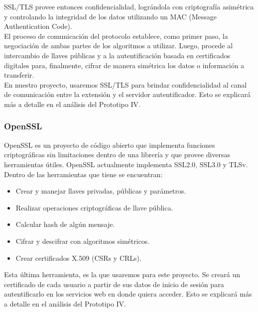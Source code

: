 \documentclass[12pt, a4paper, titlepage]{report}
\begin{document}
                SSL/TLS provee entonces confidencialidad, lográndola con criptografía asimétrica y controlando la integridad de los datos utilizando un MAC (Message Authentication Code).\\
                
                El proceso de comunicación del protocolo establece, como primer paso, la negociación de ambas partes de los algoritmos a utilizar. Luego, procede al intercambio de llaves públicas y a la autentificación basada en certificados digitales para, finalmente, cifrar de manera simétrica los datos o información a transferir.\cite{refCriptografia}\\
                
                En nuestro proyecto, usaremos SSL/TLS para brindar confidencialidad al canal de comunicación entre la extensión y el servidor autentificador. Esto se explicará más a detalle en el análisis del Prototipo IV.
                
                \subsubsection{OpenSSL}
	            OpenSSL es un proyecto de código abierto que implementa funciones criptográficas sin limitaciones dentro de una librería y que provee diversas herramientas útiles. OpenSSL actualmente implementa SSL2.0, SSL3.0 y TLSv.\cite{refCriptografia}\\
	            
	            Dentro de las herramientas que tiene se encuentran: 
	            \begin{itemize}
	                \item Crear y manejar llaves privadas, públicas y parámetros.
	                \item Realizar operaciones criptográficas de llave pública.
	                \item Calcular hash de algún mensaje.
	                \item Cifrar y descifrar con algoritmos simétricos.
	                \item Crear certificados X.509 (CSRs y CRLs).
	            \end{itemize}
	            
	            Esta última herramienta, es la que usaremos para este proyecto. Se creará un certificado de cada usuario a partir de sus datos de inicio de sesión para autentificarlo en los servicios web en donde quiera acceder. Esto se explicará más a detalle en el análisis del Prototipo IV.
	            
\end{document}
